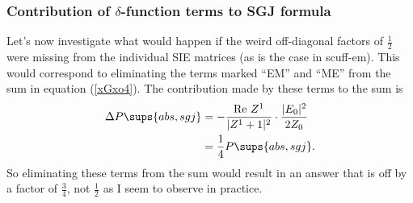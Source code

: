 \documentclass{article}
\begin{document}
\subsubsection{Contribution of $\delta$-function terms to SGJ formula}

Let's now investigate what would happen if the weird off-diagonal
factors of $\frac{1}{2}$ were missing from the individual SIE
matrices (as is the case in {\sc scuff-em}). This would correspond
to eliminating the terms marked ``EM'' and ``ME'' from the sum in
equation (\ref{xGxo4}). The contribution made by these terms to the 
sum is 
\begin{align*}
\Delta P\sups{abs,{\sc sgj}} 
  &= -\frac{\text{Re }Z^1}{|Z^1+1|^2}\cdot \frac{|E_0|^2}{2Z_0}
\\
  &=\frac{1}{4}P\sups{abs,{\sc sgj}}.
\end{align*}
So eliminating these terms from the sum would result in an answer
that is off by a factor of $\frac{3}{4}$, not $\frac{1}{2}$ as I seem
to observe in practice.
\end{document}
